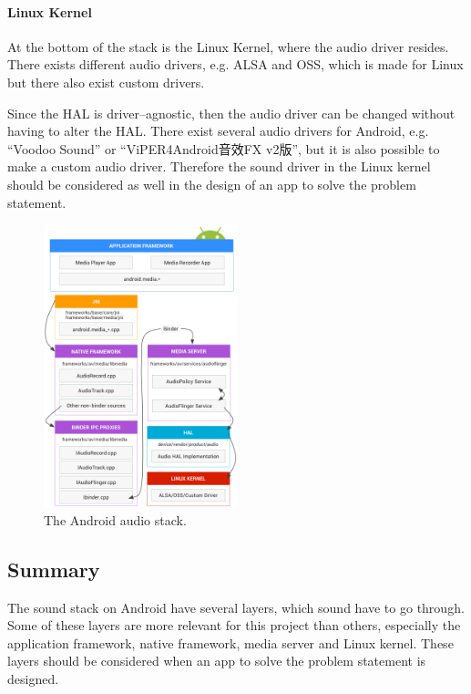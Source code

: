 \paragraph{Linux Kernel}
At the bottom of the stack is the Linux Kernel, where the audio driver resides.
There exists different audio drivers, e.g. \ac{ALSA} and \ac{OSS}, which is made for Linux but there also exist custom drivers.

Since the \ac{HAL} is driver--agnostic, then the audio driver can be changed without having to alter the \ac{HAL}. 
There exist several audio drivers for Android, e.g. ``Voodoo Sound'' or ``ViPER4Android音效FX v2版'',
but it is also possible to make a custom audio driver\cite{voodoo_sound}\cite{viper4_android}.
Therefore the sound driver in the Linux kernel should be considered as well in the design of an app to solve the problem statement.\cite{sound_stack}%

\begin{figure}[!bht]
    \centering
    \includegraphics[width=0.5\textwidth]{img/sound_stack.png}
    \caption{The Android audio stack\cite{sound_stack}.}
    \label{fig:sound_stack}
\end{figure}

\subsection{Summary}
The sound stack on Android have several layers, which sound have to go through.
Some of these layers are more relevant for this project than others,
especially the application framework, native framework, media server and Linux kernel.
These layers should be considered when an app to solve the problem statement is designed.


